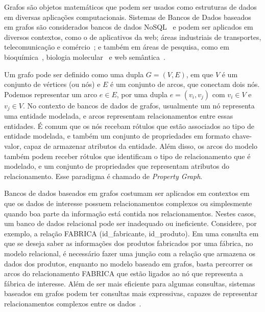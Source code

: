 \documentclass[conference]{IEEEtran}
\begin{document}

Grafos são objetos matemáticos que podem ser usados como estruturas de
dados em diversas aplicações computacionais. Sistemas de Bancos de Dados
baseados em grafos são considerados bancos de dados
NoSQL~\cite{nosqlorg} e podem ser aplicados em diversos contextos, como
o de aplicativos da web; áreas industriais de transportes,
telecomunicação e comércio~\cite{neo4jcustomers}; e também em áreas de
pesquisa, como em bioquímica~\cite{biochem4j}, biologia
molecular~\cite{biomol} e web semântica~\cite{sematicweb}.

Um grafo pode ser definido como uma dupla $G = (V, E)$,
em que $V$ é um conjunto de vértices (ou nós) e $E$ é um conjunto de
arcos, que conectam dois nós. Podemos representar um arco $e \in E$,
por uma dupla $e = (v_i, v_j)$ com $v_i \in V$ e $v_j \in V$. No
contexto de bancos de dados de grafos, usualmente um nó representa
uma entidade modelada, e arcos representam relacionamentos entre essas
entidades. É comum que os nós recebam rótulos que estão associados ao
tipo de entidade modelada, e também um conjunto de propriedades em
formato chave-valor, capaz de armazenar atributos da entidade. Além
disso, os arcos do modelo também podem receber rótulos que identificam
o tipo de relacionamento que é modelado, e um conjunto de propriedades
que representam atributos do relacionamento. Esse paradigma é chamado de
\emph{Property Graph}.

Bancos de dados baseados em grafos costumam ser aplicados em contextos
em que os dados de interesse possuem relacionamentos complexos ou
simplesmente quando boa parte da informação está contida nos
relacionamentos. Nestes casos, um banco de dados relacional pode ser
inadequado ou ineficiente. Considere, por exemplo, a relação
{\ttfamily FABRICA (id\_fabricante, id\_produto)}. Em uma consulta em
que se deseja saber as informações dos produtos fabricados por uma
fábrica, no modelo relacional, é necessário fazer uma junção com a
relação que armazena os dados dos produtos, enquanto no modelo baseado
em grafos, basta percorrer os arcos do relacionamento
{\ttfamily FABRICA} que estão ligados ao nó que representa a fábrica de
interesse. Além de ser mais eficiente para algumas consultas, sistemas
baseados em grafos podem ter consultas mais expressivas, capazes de
representar relacionamentos complexos entre os dados~\cite{neo4jquery}.
\end{document}
